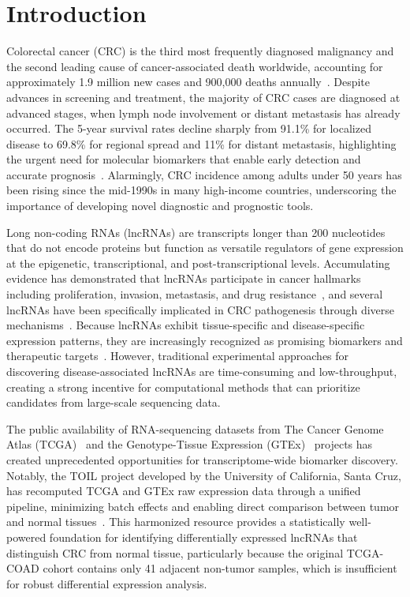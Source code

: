 \documentclass[12pt,a4paper]{article}
\begin{document}
\newpage

\section{Introduction}

Colorectal cancer (CRC) is the third most frequently diagnosed malignancy and the second leading cause of cancer-associated death worldwide, accounting for approximately 1.9 million new cases and 900,000 deaths annually~\cite{ref1}. Despite advances in screening and treatment, the majority of CRC cases are diagnosed at advanced stages, when lymph node involvement or distant metastasis has already occurred. The 5-year survival rates decline sharply from 91.1\% for localized disease to 69.8\% for regional spread and 11\% for distant metastasis, highlighting the urgent need for molecular biomarkers that enable early detection and accurate prognosis~\cite{ref1}. Alarmingly, CRC incidence among adults under 50 years has been rising since the mid-1990s in many high-income countries, underscoring the importance of developing novel diagnostic and prognostic tools.

Long non-coding RNAs (lncRNAs) are transcripts longer than 200 nucleotides that do not encode proteins but function as versatile regulators of gene expression at the epigenetic, transcriptional, and post-transcriptional levels. Accumulating evidence has demonstrated that lncRNAs participate in cancer hallmarks including proliferation, invasion, metastasis, and drug resistance~\cite{ref2}, and several lncRNAs have been specifically implicated in CRC pathogenesis through diverse mechanisms~\cite{ref3,ref4,ref5}. Because lncRNAs exhibit tissue-specific and disease-specific expression patterns, they are increasingly recognized as promising biomarkers and therapeutic targets~\cite{ref6,ref7,ref8}. However, traditional experimental approaches for discovering disease-associated lncRNAs are time-consuming and low-throughput, creating a strong incentive for computational methods that can prioritize candidates from large-scale sequencing data.

The public availability of RNA-sequencing datasets from The Cancer Genome Atlas (TCGA)~\cite{ref9} and the Genotype-Tissue Expression (GTEx)~\cite{ref10} projects has created unprecedented opportunities for transcriptome-wide biomarker discovery. Notably, the TOIL project developed by the University of California, Santa Cruz, has recomputed TCGA and GTEx raw expression data through a unified pipeline, minimizing batch effects and enabling direct comparison between tumor and normal tissues~\cite{ref11}. This harmonized resource provides a statistically well-powered foundation for identifying differentially expressed lncRNAs that distinguish CRC from normal tissue, particularly because the original TCGA-COAD cohort contains only 41 adjacent non-tumor samples, which is insufficient for robust differential expression analysis.
\end{document}
